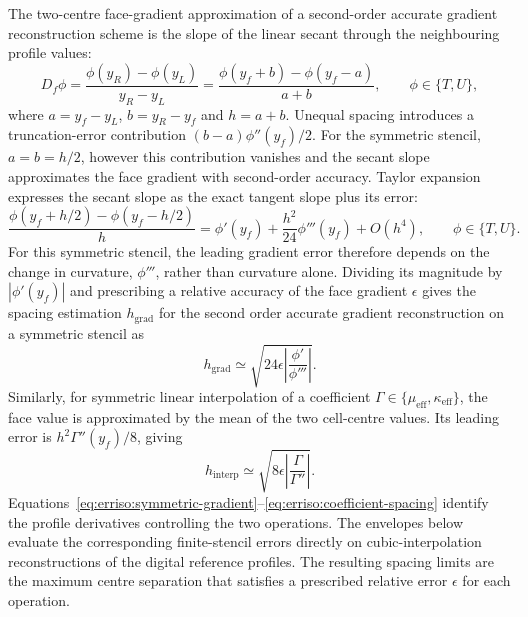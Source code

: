 The two-centre face-gradient approximation of a second-order accurate gradient reconstruction scheme is the slope of the linear secant through the neighbouring profile values:
\begin{equation}
    D_f\phi=\frac{\phi(y_R)-\phi(y_L)}{y_R-y_L}
    =\frac{\phi(y_f+b)-\phi(y_f-a)}{a+b},
    \qquad \phi\in\{T,U\},
\end{equation}
where $a=y_f-y_L$, $b=y_R-y_f$ and $h=a+b$. Unequal spacing introduces a truncation-error contribution $(b-a)\phi''(y_f)/2$. For the symmetric stencil, $a=b=h/2$, however this contribution vanishes and the secant slope approximates the face gradient with second-order accuracy. Taylor expansion expresses the secant slope as the exact tangent slope plus its error:
\begin{equation}
    \frac{\phi(y_f+h/2)-\phi(y_f-h/2)}{h}
    =\phi'(y_f)+\frac{h^2}{24}\phi'''(y_f)+O(h^4),
    \qquad \phi\in\{T,U\}.
    \label{eq:erriso:symmetric-gradient}
\end{equation}
For this symmetric stencil, the leading gradient error therefore depends on the change in curvature, $\phi'''$, rather than curvature alone. Dividing its magnitude by $|\phi'(y_f)|$ and prescribing a relative accuracy of the face gradient $\epsilon$ gives the spacing estimation $h_{\mathrm{grad}}$ for the second order accurate gradient reconstruction on a symmetric stencil as
\begin{equation}
    h_{\mathrm{grad}}\simeq
    \sqrt{24\epsilon\left|\frac{\phi'}{\phi'''}\right|}.
    \label{eq:erriso:gradient-spacing}
\end{equation}
Similarly, for symmetric linear interpolation of a coefficient $\Gamma\in\{\mu_{\mathrm{eff}},\kappa_{\mathrm{eff}}\}$, the face value is approximated by the mean of the two cell-centre values. Its leading error is $h^2\Gamma''(y_f)/8$, giving
\begin{equation}
    h_{\mathrm{interp}}\simeq
    \sqrt{8\epsilon\left|\frac{\Gamma}{\Gamma''}\right|}.
    \label{eq:erriso:coefficient-spacing}
\end{equation}
Equations~\eqref{eq:erriso:symmetric-gradient}--\eqref{eq:erriso:coefficient-spacing} identify the profile derivatives controlling the two operations. The envelopes below evaluate the corresponding finite-stencil errors directly on cubic-interpolation reconstructions of the digital reference profiles. The resulting spacing limits are the maximum centre separation that satisfies a prescribed relative error $\epsilon$ for each operation. 
\par\medskip

